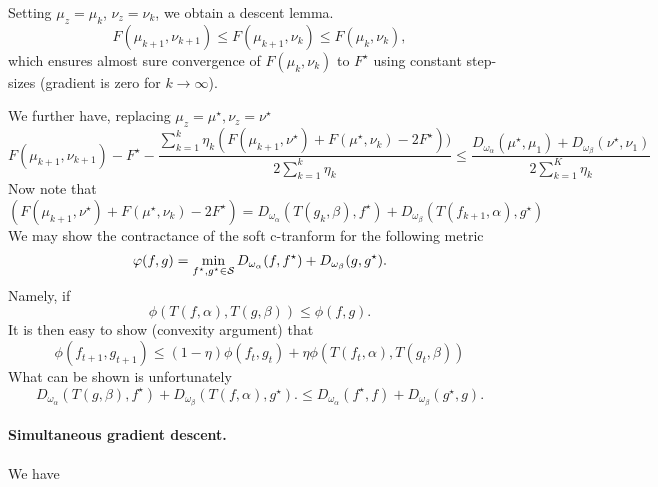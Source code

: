 \documentclass[a4paper, 10pt]{article}
\begin{document}
Setting $\mu_z = \mu_{k}$, $\nu_z = \nu_k$, we obtain a descent lemma.
\begin{equation}
    F(\mu_{k+1}, \nu_{k+1}) \leq F(\mu_{k+1}, \nu_{k}) \leq F(\mu_{k}, \nu_{k}),
\end{equation}
which ensures almost sure convergence of $F(\mu_k, \nu_k)$ to $F^\star$ using constant step-sizes (gradient is zero for $k \to \infty$).

We further have, replacing $\mu_z = \mu^\star, \nu_z = \nu^\star$
%
\begin{equation}
    F(\mu_{k+1}, \nu_{k+1}) - F^\star
    - \frac{
        \sum_{k=1}^k \eta_k (F(\mu_{k+1}, \nu^\star)
    +F(\mu^\star, \nu_k) - 2 F^\star))
    }
    {2 \sum_{k=1}^k \eta_k}
    \leq \frac{
    D_{\omega_\alpha}(\mu^\star, \mu_1)
    + D_{\omega_\beta}(\nu^\star, \nu_1)
    }{2 \sum_{k=1}^K \eta_k}
\end{equation}
Now note that
\begin{equation}
    (F(\mu_{k+1}, \nu^\star)
    +F(\mu^\star, \nu_k) - 2 F^\star) =
     D_{\omega_\alpha}(T(g_k, \beta), f^\star)
     + D_{\omega_\beta}(T(f_{k+1}, \alpha), g^\star)
\end{equation}
We may show the contractance of the soft c-tranform for the following metric
\begin{equation}
    \varphi(f, g) = \min_{f^\star, g^\star \in \mathcal{S}} 
    D_{\omega_\alpha}(f, f^\star)
    +
    D_{\omega_\beta}(g, g^\star).
\end{equation}
Namely, if 
\begin{equation}
    \phi(T(f,\alpha), T(g,\beta))
    \leq \phi(f, g).
\end{equation}
It is then easy to show (convexity argument) that
\begin{equation}
    \phi(f_{t+1}, g_{t+1}) \leq
    (1-\eta) 
    \phi(f_t, g_t)
    + \eta \phi(T(f_t,\alpha), T(g_t,\beta))
\end{equation}
What can be shown is unfortunately
\begin{equation}
    D_{\omega_\alpha}(T(g,\beta), f^\star) +
    D_{\omega_\beta}(T(f,\alpha), g^\star). \leq
    D_{\omega_\alpha}(f^\star, f)
    +
    D_{\omega_\beta}(g^\star, g).
\end{equation}



\paragraph{Simultaneous gradient descent.} We have
\end{document}
